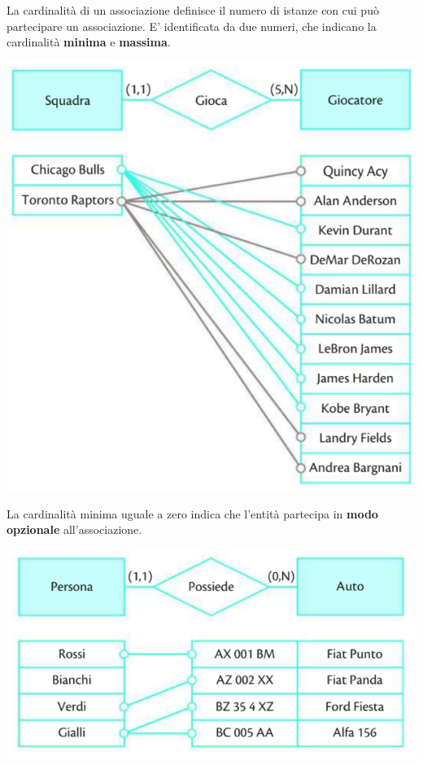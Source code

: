 \documentclass{article}
\begin{document}
  La cardinalità di un associazione definisce il numero di istanze con cui può partecipare un associazione. E' identificata da due numeri, che indicano la cardinalità \textbf{minima} e \textbf{massima}.\\
  \begin{center}
      
  
\includegraphics[scale=0.75]{ca.PNG}
\end{center}

La cardinalità minima uguale a zero indica che l'entità partecipa in \textbf{modo opzionale} all'associazione.  
\begin{center}
\includegraphics[]{per.PNG}    
\end{center}
\end{document}
